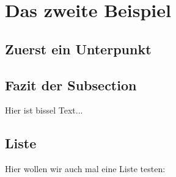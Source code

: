 \section{Das zweite Beispiel}

\subsection{Zuerst ein Unterpunkt}
\blindtext

\subsection{Fazit der Subsection}
\blindtext


\blindtext

Hier ist bissel Text... \cite{Martin:2008:CCH:1388398}

\blindtext
{}

\blindtext

\subsection{Liste}
Hier wollen wir auch mal eine Liste testen:

\Blinditemize
